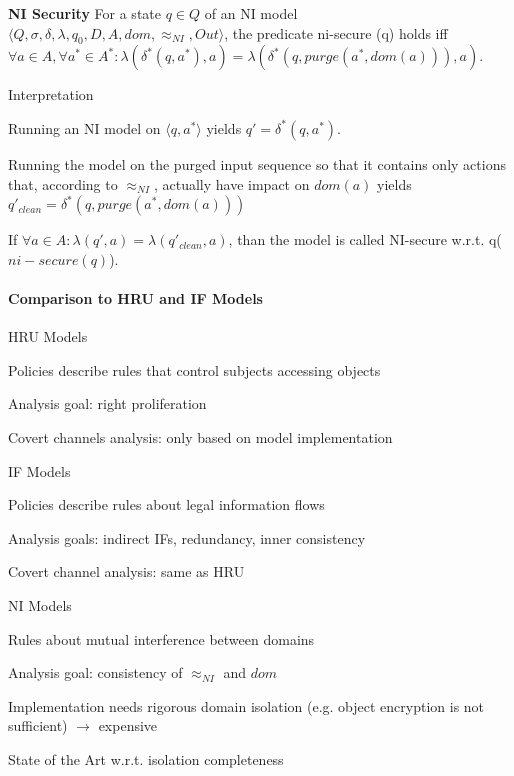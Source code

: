 \documentclass[a4paper]{article}
\renewcommand{\note}[2]{\begin{noteBox} \textbf{#1} #2 \end{noteBox}}
\begin{document}
\begin{multicols}{3}
    \note{NI Security}{For a state $q\in Q$ of an NI model $\langle Q,\sigma,\delta,\lambda,q_0,D,A,dom,\approx_{NI},Out\rangle$, the predicate ni-secure (q) holds iff $\forall a\in A,\forall a^*\in A^*:\lambda (\delta^*(q,a^*),a)=\lambda(\delta^*(q,purge(a^*,dom(a))),a)$.}

    Interpretation
    \begin{enumerate*}
        \item Running an NI model on $\langle q,a^*\rangle$ yields $q'=\delta^*(q,a^*)$.
        \item Running the model on the purged input sequence so that it contains only actions that, according to $\approx_{NI}$, actually have impact on $dom(a)$ yields $q'_{clean}=\delta^*(q,purge(a^*,dom(a)))$
        \item If $\forall a\in A:\lambda(q',a)=\lambda(q'_{clean},a)$, than the model is called NI-secure w.r.t. q($ni-secure(q)$).
    \end{enumerate*}

    \paragraph{Comparison to HRU and IF Models}
    \begin{itemize*}
        \item HRU Models
        \begin{itemize*}
            \item Policies describe rules that control subjects accessing objects
            \item Analysis goal: right proliferation
            \item Covert channels analysis: only based on model implementation
        \end{itemize*}
        \item IF Models
        \begin{itemize*}
            \item Policies describe rules about legal information flows
            \item Analysis goals: indirect IFs, redundancy, inner consistency
            \item Covert channel analysis: same as HRU
        \end{itemize*}
        \item NI Models
        \begin{itemize*}
            \item Rules about mutual interference between domains
            \item Analysis goal: consistency of $\approx_{NI}$ and $dom$
            \item Implementation needs rigorous domain isolation (e.g. object encryption is not sufficient) $\rightarrow$ expensive
            \item State of the Art w.r.t. isolation completeness
        \end{itemize*}
    \end{itemize*}


\end{multicols}
\end{document}
